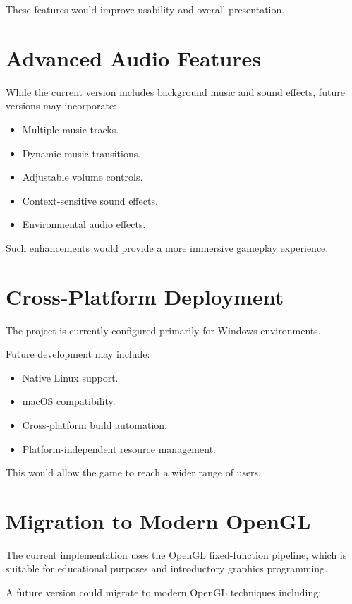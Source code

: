 \documentclass[12pt,a4paper]{report}
\begin{document}
These features would improve usability and overall presentation.

\section{Advanced Audio Features}

While the current version includes background music and sound effects, future versions may incorporate:

\begin{itemize}
    \item Multiple music tracks.
    \item Dynamic music transitions.
    \item Adjustable volume controls.
    \item Context-sensitive sound effects.
    \item Environmental audio effects.
\end{itemize}

Such enhancements would provide a more immersive gameplay experience.

\section{Cross-Platform Deployment}

The project is currently configured primarily for Windows environments.

Future development may include:

\begin{itemize}
    \item Native Linux support.
    \item macOS compatibility.
    \item Cross-platform build automation.
    \item Platform-independent resource management.
\end{itemize}

This would allow the game to reach a wider range of users.

\section{Migration to Modern OpenGL}

The current implementation uses the OpenGL fixed-function pipeline, which is suitable for educational purposes and introductory graphics programming.

A future version could migrate to modern OpenGL techniques including:
\end{document}
